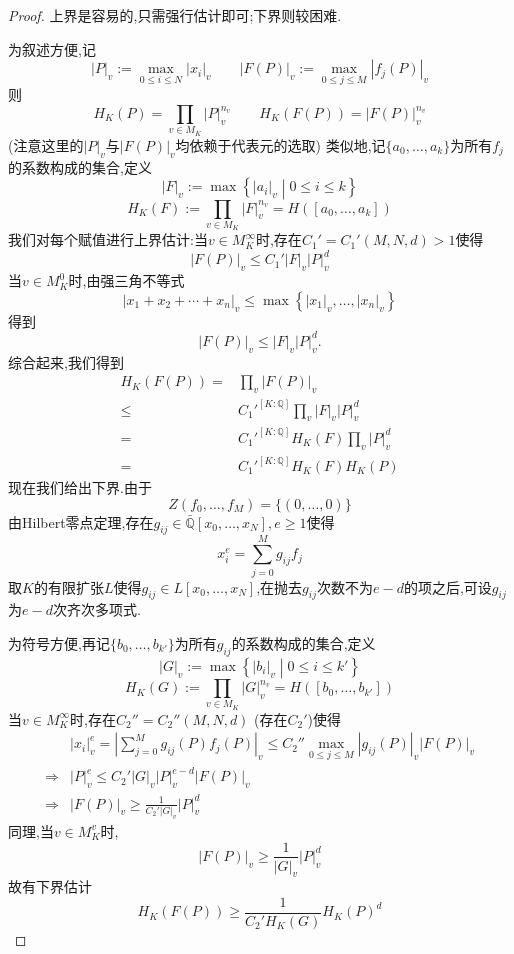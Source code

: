 \documentclass[12pt,A4paper,oneside,reqno]{amsart}
\numberwithin{equation}{section}
\theoremstyle{definition}
\theoremstyle{plain}
\theoremstyle{plain}
\numberwithin{equation}{section}
\theoremstyle{remark}
\begin{document}
\begin{proof}
	上界是容易的,只需强行估计即可;下界则较困难.
	
	为叙述方便,记
	$$|P|_v:=\max_{0 \leqslant i \leqslant N}|x_i|_v \qquad |F(P)|_v:=\max_{0 \leqslant j \leqslant M}|f_j(P)|_v$$
	则
	$$H_K(P)=\prod_{v \in M_K}|P|_v^{n_v} \qquad H_K(F(P))=|F(P)|_v^{n_v}$$
	(注意这里的$|P|_v$与$|F(P)|_v$均依赖于代表元的选取)
	类似地,记$\{a_0,\ldots,a_k \}$为所有$f_j$的系数构成的集合,定义
	$$|F|_v:=\max\left\{|a_i|_v \middle| 0 \leqslant i \leqslant k  \right\}$$ $$ H_K(F):=\prod_{v \in M_K}|F|_v^{n_v}=H([a_0, \ldots,a_k])$$
	我们对每个赋值进行上界估计:当$v \in M_K^{\infty}$时,存在$C_1'=C_1'(M,N,d)>1$使得
	$$|F(P)|_v \leqslant C_1'|F|_v|P|_v^d$$
	当$v \in M_K^0$时,由强三角不等式
	$$|x_1+x_2+\cdots +x_n|_v \leqslant \max \left\{|x_1|_v, \ldots, |x_n|_v \right\}$$
	得到$$|F(P)|_{v} \leqslant |F|_{v}|P|_{v}^d.$$
	综合起来,我们得到
	\begin{equation*}
	\begin{aligned}
	 H_K(F(P))=&\prod_{v}|F(P)|_v\\
	 \leqslant &C_1'^{[K:\mathbb{Q}]} \prod_{v}|F|_v|P|_v^d\\
	 =&C_1'^{[K:\mathbb{Q}]} H_K(F)\prod_{v}|P|_v^d\\
	 =&C_1'^{[K:\mathbb{Q}]} H_K(F)H_K(P)
	\end{aligned}
	\end{equation*}
	现在我们给出下界.由于
	$$Z(f_0,\ldots,f_M)=\{(0,\ldots,0)\}$$
	由Hilbert零点定理,存在$g_{ij} \in \bar{\mathbb{Q}}[x_0,\ldots,x_N], e \geqslant 1$使得
	$$x_i^e=\sum_{j=0}^{M}g_{ij}f_j$$
	取$K$的有限扩张$L$使得$g_{ij}\in L[x_0,\ldots,x_N]$,在抛去$g_{ij}$次数不为$e-d$的项之后,可设$g_{ij}$为$e-d$次齐次多项式.
	
	为符号方便,再记$\{b_0,\ldots,b_{k'} \}$为所有$g_{ij}$的系数构成的集合,定义
	$$|G|_v:=\max\left\{|b_i|_v \middle| 0 \leqslant i \leqslant {k'}  \right\}$$ $$ H_K(G):=\prod_{v \in M_K}|G|_v^{n_v}=H([b_0, \ldots,b_{k'}])$$
	当$v \in M_K^{\infty}$时,存在$C_2''=C_2''(M,N,d)$ (存在$C_2'$)使得
	\begin{equation*}
	\begin{aligned}
	&|x_i|_v^e=\left|\sum_{j=0}^{M}g_{ij}(P)f_j(P)\right|_v\leqslant C_2''\max_{0 \leqslant j \leqslant M} |g_{ij}(P)|_v|F(P)|_v\\
	\Longrightarrow & |P|_v^e \leqslant C_2'|G|_v|P|_v^{e-d}|F(P)|_v\\
	\Longrightarrow & |F(P)|_v \geqslant \frac{1}{C_2'|G|_v}|P|_v^{d}
	\end{aligned}
	\end{equation*}
	同理,当$v \in M_K^{v}$时,
	$$|F(P)|_v \geqslant \frac{1}{|G|_v}|P|_v^d$$
	故有下界估计
	$$H_K(F(P)) \geqslant \frac{1}{C_2'H_K(G)}H_K(P)^d$$
\end{proof}
\end{document}
